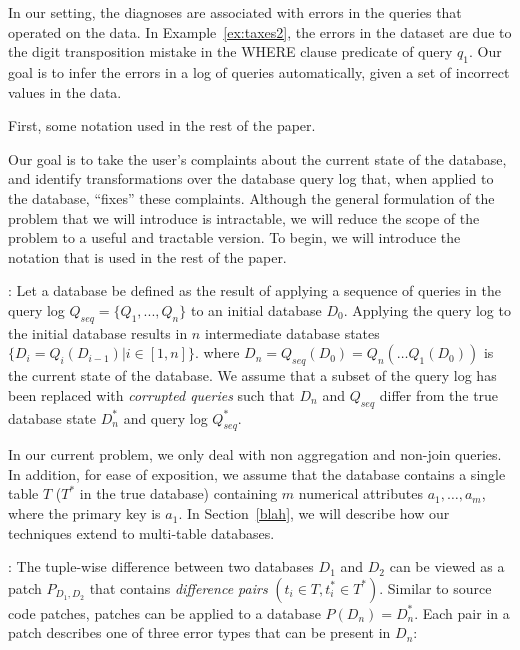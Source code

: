 In our setting, the diagnoses are associated with errors in the queries that
operated on the data. In Example~\ref{ex:taxes2}, the errors in the dataset
are due to the digit transposition mistake in the WHERE clause predicate of
query $q_1$.  Our goal is to infer the errors in a log of queries automatically, given a set of incorrect values in the data.



\xxx{===}

First, some notation used in the rest of the paper.

Our goal is to take the user's complaints about the current state
of the database, and identify transformations over the database
query log that, when applied to the database, ``fixes'' these
complaints.  Although the general formulation of the problem that
we will introduce is intractable, we will reduce the scope of the
problem to a useful and tractable version.  To begin, we will
introduce the notation that is used in the rest of the paper.

: Let a database
be defined as the result of applying a sequence of queries in the query log
$Q_{seq}=\{Q_1,..., Q_n\}$ to an initial database $D_0$.  
Applying the query log to the initial database 
results in $n$ intermediate database states $\{D_i = Q_i(D_{i-1}) | i \in [1, n]\}$.  
where $D_n = Q_{seq}(D_0) = Q_n(\ldots Q_1(D_0))$ is the current state of the database. 
We assume that a subset of the query log has been replaced with {\it corrupted queries} 
such that $D_n$ and $Q_{seq}$ differ from the true database state $D^*_n$ and query log $Q^*_{seq}$.

In our current problem, we only deal with non aggregation and non-join queries.
In addition, for ease of exposition, we assume that the database contains a single table $T$ 
($T^*$ in the true database) containing $m$ numerical attributes $a_1,\ldots,a_m$, 
where the primary key is $a_1$.  
In Section~\ref{blah}, we will describe how our techniques extend to multi-table databases.



:
The tuple-wise difference between two databases $D_1$ and $D_2$ can be viewed as a patch
$P_{D_1, D_2}$ that contains {\it difference pairs} $(t_i \in T, t^*_i \in T^*)$.
Similar to source code patches, patches can be applied to a database $P(D_n) = D^*_n$.
Each pair in a patch describes one of three error types that can be present in $D_n$:

